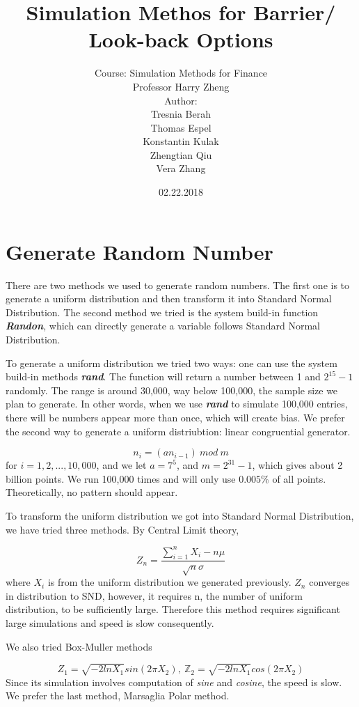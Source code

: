 \documentclass[12pt,a4paper,fleqn]{article}
\author{Course: Simulation Methods for Finance\\Professor Harry Zheng
\\[3cm] Author:\\ Tresnia Berah\\ Thomas Espel\\ Konstantin Kulak\\ Zhengtian Qiu\\Vera Zhang }
\title{Simulation Methos for Barrier/ Look-back Options }
\date{02.22.2018}
\newcommand\Z{\mathbb Z}
\begin{document}
\maketitle







\newpage




\newpage

\section{Generate Random Number}

There are two methods we used to generate random numbers. 
The first one is to generate a uniform distribution and then transform it into Standard Normal Distribution. The second method we tried is the system build-in function\textbf{\textit{ Randon}}, which can directly generate a variable follows Standard Normal Distribution. 

To generate a uniform distribution we tried two ways: one can use the system build-in methods \textbf{\textit{rand}}. The function will return a number between 1 and $2^{15} -1$ randomly. The range is around 30,000, way below 100,000, the sample size we plan to generate. In other words, when we use \textbf{\textit{rand}} to simulate 100,000 entries, there will be numbers appear more than once, which will create bias. We prefer the second way to generate a uniform distriubtion: linear congruential generator.

$$n_i = (an_{i-1}) \ mod\ m$$for $i=1,2,...,10,000$, and we let $ a = 7^5$, and $m = 2^{31}-1$, which gives about 2 billion points. We run 100,000 times and will only use $0.005\%$ of all points. Theoretically, no pattern should appear. 

To transform the uniform distribution we got into Standard Normal Distribution, we have tried three methods. By Central Limit theory, 

$$ Z_n = \frac{\sum_{i=1}^{n}X_i-n\mu}{\sqrt{n}\sigma}$$where $X_i$ is from the uniform distribution we generated previously. $Z_n$ converges in distribution to SND, however, it requires n, the number of uniform distribution, to be sufficiently large. Therefore this method requires significant large simulations and speed is slow consequently. 

We also tried Box-Muller methods 

$$Z_1 = \sqrt{-2lnX_1}sin(2\pi X_2),\  \Z_2=\sqrt{-2lnX_1}cos(2\pi X_2)$$Since its simulation involves computation of \textit{sine} and \textit{cosine}, the speed is slow. 
We prefer the last method, Marsaglia Polar method. 
\end{document}
